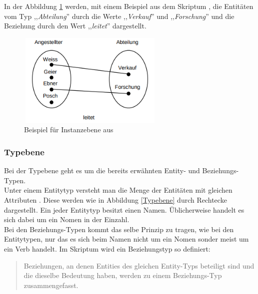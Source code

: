 \noindent
In der Abbildung \ref{Instanzebene} werden, mit einem Beispiel aus dem Skriptum , die Entitäten vom Typ ,,\textit{Abteilung}'' durch die Werte ,,\textit{Verkauf}'' und ,,\textit{Forschung}'' und die Beziehung durch den Wert ,,\textit{leitet}'' dargestellt.
\\

\begin{figure}[H]
	\begin{center}
		\includegraphics[width=7cm,height=4.5cm]{images/InstanzebeneBsp.png}
		\caption{Beispiel für Instanzebene aus 
		}
		\label{Instanzebene}
	\end{center}
\end{figure}

\subsubsection{Typebene}

Bei der Typebene geht es um die bereits erwähnten Entity- und Beziehungs-Typen.
\\

\noindent
Unter einem Entitytyp versteht man die Menge der Entitäten mit gleichen Attributen . Diese werden wie in Abbildung \ref{Typebene} durch Rechtecke dargestellt. Ein jeder Entitytyp besitzt einen Namen. Üblicherweise handelt es sich dabei um ein Nomen in der Einzahl.
\\

\noindent
Bei den Beziehungs-Typen kommt das selbe Prinzip zu tragen, wie bei den Entitytypen, nur das es sich beim Namen nicht um ein Nomen sonder meist um ein Verb handelt. Im Skriptum  wird ein Beziehungstyp so definiert:

\begin{quote}
	Beziehungen, an denen Entities des
	gleichen Entity-Typs beteiligt sind und die dieselbe Bedeutung haben, werden zu einem Beziehungs-Typ
	zusammengefasst. 
\end{quote}

